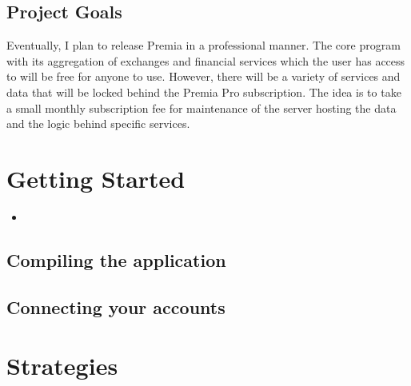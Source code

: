 \documentclass[12pt, oneside]{report}
\newcommand{\insertcode}[2]{\begin{itemize}\item[]\end{itemize}}
\begin{document}
\section{Project Goals}

Eventually, I plan to release Premia in a professional manner. The core program with its aggregation of exchanges and financial services which the user has access to will be free for anyone to use. However, there will be a variety of services and data that will be locked behind the Premia Pro subscription. The idea is to take a small monthly subscription fee for maintenance of the server hosting the data and the logic behind specific services. 

\chapter{Getting Started}
\insertcode{"code/test.cc"}{An example Hello World program in C++}
\section{Compiling the application}
\section{Connecting your accounts}

\chapter{Strategies}

\begin{center}
\end{center}
\end{document}
